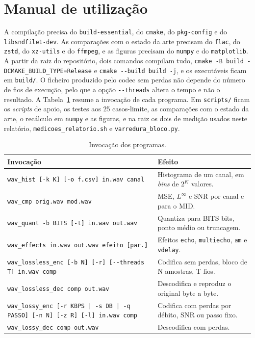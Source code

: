 \documentclass[a4paper,11pt]{article}
\newcommand{\prog}[1]{\texttt{#1}}
\begin{document}
\section{Manual de utilização}
\label{sec:manual}
A compilação precisa do \texttt{build-essential}, do \texttt{cmake}, do
\texttt{pkg-config} e do \texttt{libsndfile1-dev}. As comparações com o estado
da arte precisam do \texttt{flac}, do \texttt{zstd}, do \texttt{xz-utils} e do
\texttt{ffmpeg}, e as figuras precisam do \texttt{numpy} e do
\texttt{matplotlib}. A partir da raiz do repositório, dois comandos compilam
tudo, \texttt{cmake -B build -DCMAKE\_BUILD\_TYPE=Release} e
\texttt{cmake -{}-build build -j}, e os executáveis ficam em \texttt{build/}. O
ficheiro produzido pelo codec sem perdas não depende do número de fios de
execução, pelo que a opção \texttt{-{}-threads} altera o tempo e não o
resultado. A Tabela~\ref{tab:manual} resume a invocação de cada programa. Em \texttt{scripts/} ficam os \emph{scripts} de apoio, os testes aos
25 casos-limite, as comparações com o estado da arte, o recálculo em
\prog{numpy} e as figuras, e na raiz os dois de medição usados neste relatório,
\texttt{medicoes\_relatorio.sh} e \texttt{varredura\_bloco.py}.

\begin{table}[htbp]
\centering
\caption{Invocação dos programas.}
\label{tab:manual}
\scriptsize
\setlength{\tabcolsep}{4pt}
\begin{tabular}{>{\raggedright\arraybackslash}p{8.5cm} >{\raggedright\arraybackslash}p{7.0cm}}
\toprule
Invocação & Efeito \\
\midrule
\texttt{wav\_hist [-k K] [-o f.csv] in.wav canal} & Histograma de um canal, em \emph{bins} de $2^K$ valores. \\
\texttt{wav\_cmp orig.wav mod.wav} & MSE, $L^\infty$ e SNR por canal e para o MID. \\
\texttt{wav\_quant -b BITS [-t] in.wav out.wav} & Quantiza para BITS bits, ponto médio ou truncagem. \\
\texttt{wav\_effects in.wav out.wav efeito [par.]} & Efeitos \texttt{echo}, \texttt{multiecho}, \texttt{am} e \texttt{vdelay}. \\
\texttt{wav\_lossless\_enc [-b N] [-r] [-{}-threads T] in.wav comp} & Codifica sem perdas, bloco de N amostras, T fios. \\
\texttt{wav\_lossless\_dec comp out.wav} & Descodifica e reproduz o original byte a byte. \\
\texttt{wav\_lossy\_enc [-r KBPS | -s DB | -q PASSO] [-n N] [-z R] [-l] in.wav comp} & Codifica com perdas por débito, SNR ou passo fixo. \\
\texttt{wav\_lossy\_dec comp out.wav} & Descodifica com perdas. \\
\bottomrule
\end{tabular}
\end{table}
\end{document}
